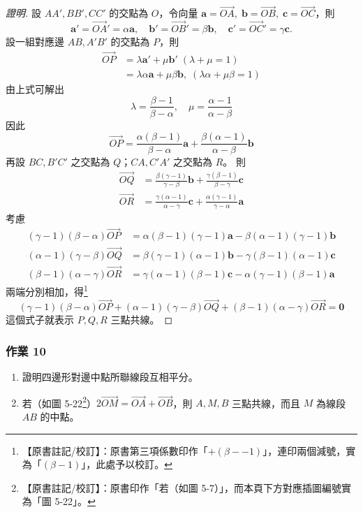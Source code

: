 \begin{proof}[證明]
設 $AA', BB', CC'$ 的交點為 $O$，令向量 $\mathbf{a} = \vec{OA},\; \mathbf{b} = \vec{OB},\; \mathbf{c} = \vec{OC}$，則
\[ \mathbf{a}' = \vec{OA}' = \alpha \mathbf{a},\quad \mathbf{b}' = \vec{OB}' = \beta \mathbf{b},\quad \mathbf{c}' = \vec{OC}' = \gamma \mathbf{c}. \]
設一組對應邊 $AB, A'B'$ 的交點為 $P$，則
\begin{align*}
\vec{OP} &= \lambda \mathbf{a}' + \mu \mathbf{b}' \; (\lambda + \mu = 1) \\
&= \lambda \alpha \mathbf{a} + \mu \beta \mathbf{b},\; (\lambda \alpha + \mu \beta = 1)
\end{align*}
由上式可解出
\[ \lambda = \frac{\beta - 1}{\beta - \alpha},\quad \mu = \frac{\alpha - 1}{\alpha - \beta} \]
因此
\[ \vec{OP} = \frac{\alpha(\beta - 1)}{\beta - \alpha}\mathbf{a} + \frac{\beta(\alpha - 1)}{\alpha - \beta}\mathbf{b} \]
再設 $BC, B'C'$ 之交點為 $Q$；$CA, C'A'$ 之交點為 $R$。
則
\begin{align*}
\vec{OQ} &= \frac{\beta(\gamma - 1)}{\gamma - \beta}\mathbf{b} + \frac{\gamma(\beta - 1)}{\beta - \gamma}\mathbf{c} \\
\vec{OR} &= \frac{\gamma(\alpha - 1)}{\alpha - \gamma}\mathbf{c} + \frac{\alpha(\gamma - 1)}{\gamma - \alpha}\mathbf{a}
\end{align*}
考慮
\begin{align*}
(\gamma - 1)(\beta - \alpha)\vec{OP} &= \alpha(\beta - 1)(\gamma - 1)\mathbf{a} - \beta(\alpha - 1)(\gamma - 1)\mathbf{b} \\
(\alpha - 1)(\gamma - \beta)\vec{OQ} &= \beta(\gamma - 1)(\alpha - 1)\mathbf{b} - \gamma(\beta - 1)(\alpha - 1)\mathbf{c} \\
(\beta - 1)(\alpha - \gamma)\vec{OR} &= \gamma(\alpha - 1)(\beta - 1)\mathbf{c} - \alpha(\gamma - 1)(\beta - 1)\mathbf{a}
\end{align*}
兩端分別相加，得\label{note:b3s-ch5-p249-double-minus}\footnote{【原書註記/校訂】：原書第三項係數印作「$+(\beta--1)$」，連印兩個減號，實為「$(\beta - 1)$」，此處予以校訂。}
\[ (\gamma - 1)(\beta - \alpha)\vec{OP} + (\alpha - 1)(\gamma - \beta)\vec{OQ} + (\beta - 1)(\alpha - \gamma)\vec{OR} = \mathbf{0} \]
這個式子就表示 $P, Q, R$ 三點共線。
\end{proof}

\subsubsection*{作業 10}
\begin{enumerate}[label=(\roman*), leftmargin=2.5em]
  \item 證明四邊形對邊中點所聯線段互相平分。
  \item 若（如圖 5-22\label{note:b3s-ch5-p249-fig-ref}\footnote{【原書註記/校訂】：原書印作「若（如圖 5-7）」，而本頁下方對應插圖編號實為「圖 5-22」。}）$2\vec{OM} = \vec{OA} + \vec{OB}$，則 $A, M, B$ 三點共線，而且 $M$ 為線段 $AB$ 的中點。
\end{enumerate}

